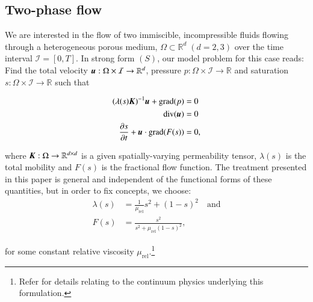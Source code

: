 \subsection{Two-phase flow}
\label{two-phase-flow}

We are interested in the flow of two immiscible, incompressible fluids
flowing through a heterogeneous porous medium, $\Omega \subset
\mathbb{R}^{d}\; (d = 2, 3)$ over the time interval $\mathcal{I} = [0,
T]$. In strong form $(S)$, our model problem for this case reads: Find
the total velocity $\mbox{\boldmath$ u$}: \Omega \times \mathcal{I} \rightarrow
\mathbb{R}^{d}$, pressure $p: \Omega \times \mathcal{I} \rightarrow
\mathbb{R}$ and saturation $s: \Omega \times \mathcal{I} \rightarrow
\mathbb{R}$ such that

\begin{equation}
  \begin{split}
    (\lambda(s)\mbox{\boldmath$ K$})^{-1}\mbox{\boldmath$ u$} + \mathrm{grad}(p) & = 0\\
    \mathrm{div}(\mbox{\boldmath$ u$}) & = 0\\
    \frac{\partial s}{\partial t} + \mbox{\boldmath$ u$}\cdot\mathrm{grad}(F(s)) & = 0,
  \end{split}
\label{two-phase-flow-strong}
\end{equation}

\noindent where $\mbox{\boldmath$ K$}: \Omega \rightarrow \mathbb{R}^{d \times d}$ is
a given spatially-varying permeability tensor, $\lambda(s)$ is the
total mobility and $F(s)$ is the fractional flow function. The
treatment presented in this paper is general and independent of the
functional forms of these quantities, but in order to fix concepts, we
choose:
\begin{equation}
  \begin{split}
    \lambda(s) & = \frac{1}{\mu_{\mathrm{rel}}} s^{2} + (1 - s)^{2}
    \quad \mathrm{and}\\
    F(s) & = \frac{s^{2}}{s^{2} + \mu_{\mathrm{rel}} (1 - s)^{2}},
  \end{split}
\end{equation}

\noindent for some constant relative viscosity
$\mu_{\mathrm{rel}}$.\footnote{Refer \cite{allen:1985} for details
  relating to the continuum physics underlying this formulation.}

